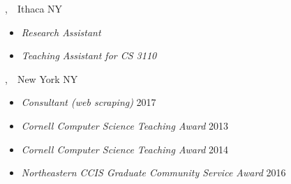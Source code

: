 \documentclass{article}
\begin{document}
,~~Ithaca NY
\begin{itemize}
  \item \emph{Research Assistant} \hfill {}
  \item \emph{Teaching Assistant for CS 3110} \hfill {}
\end{itemize}

,~~New York NY
\begin{itemize}
  \item \emph{Consultant (web scraping)} \hfill 2017
\end{itemize}


\newpage
{} %
\begin{itemize}
  \item \emph{Cornell Computer Science Teaching Award} \hfill 2013
  \item \emph{Cornell Computer Science Teaching Award} \hfill 2014
  \item \emph{Northeastern CCIS Graduate Community Service Award} \hfill 2016
\end{itemize}

\end{document}

